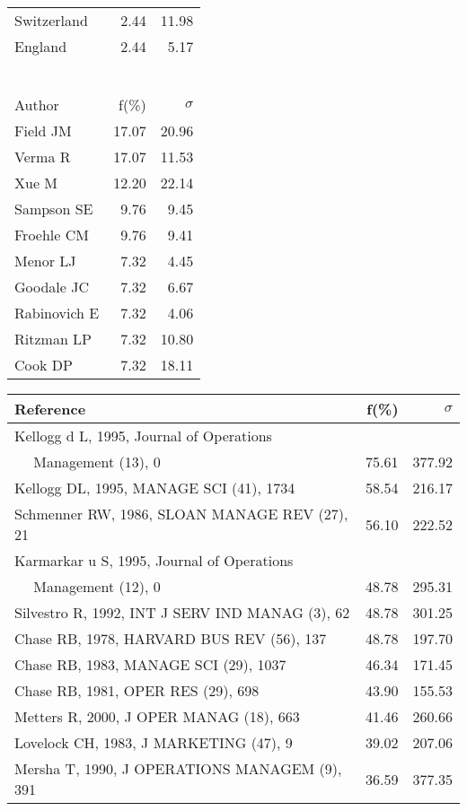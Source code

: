 \documentclass[a4paper,11pt]{report}
\begin{document}
\begin{landscape}
\begin{table}[!ht]
{\begin{tabular}{|l r r|}
Switzerland & 2.44 & 11.98\\
England & 2.44 & 5.17\\
 &  & \\
 &  & \\
 &  & \\
 &  & \\
 &  & \\
 &  & \\
\hline
\hline
Author & f(\%) & $\sigma$\\
\hline
Field JM & 17.07 & 20.96\\
Verma R & 17.07 & 11.53\\
Xue M & 12.20 & 22.14\\
Sampson SE & 9.76 & 9.45\\
Froehle CM & 9.76 & 9.41\\
Menor LJ & 7.32 & 4.45\\
Goodale JC & 7.32 & 6.67\\
Rabinovich E & 7.32 & 4.06\\
Ritzman LP & 7.32 & 10.80\\
Cook DP & 7.32 & 18.11\\
\hline
\end{tabular}
}
{\scriptsize\begin{tabular}{|l r r|}
\hline
Reference & f(\%) & $\sigma$\\
\hline
Kellogg d L, 1995, Journal of Operations &  & \\
$\quad$ Management (13), 0 & 75.61 & 377.92\\
Kellogg DL, 1995, MANAGE SCI (41), 1734 & 58.54 & 216.17\\
Schmenner RW, 1986, SLOAN MANAGE REV (27), 21 & 56.10 & 222.52\\
Karmarkar u S, 1995, Journal of Operations &  & \\
$\quad$ Management (12), 0 & 48.78 & 295.31\\
Silvestro R, 1992, INT J SERV IND MANAG (3), 62 & 48.78 & 301.25\\
Chase RB, 1978, HARVARD BUS REV (56), 137 & 48.78 & 197.70\\
Chase RB, 1983, MANAGE SCI (29), 1037 & 46.34 & 171.45\\
Chase RB, 1981, OPER RES (29), 698 & 43.90 & 155.53\\
Metters R, 2000, J OPER MANAG (18), 663 & 41.46 & 260.66\\
Lovelock CH, 1983, J MARKETING (47), 9 & 39.02 & 207.06\\
Mersha T, 1990, J OPERATIONS MANAGEM (9), 391 & 36.59 & 377.35\\

\end{tabular}}
\end{table}
\end{landscape}
\end{document}
